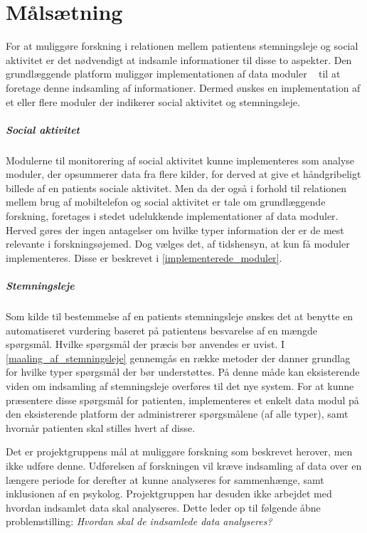 \chapter{Målsætning}\label{problem}
For at muliggøre forskning i relationen mellem patientens stemningsleje og social aktivitet er det nødvendigt at indsamle informationer til disse to aspekter.
Den grundlæggende platform muliggør implementationen af data moduler ~ til at foretage denne indsamling af informationer.
Dermed ønskes en implementation af et eller flere moduler der indikerer social aktivitet og stemningsleje.

\paragraph{Social aktivitet}
Modulerne til monitorering af social aktivitet kunne implementeres som analyse moduler, der opsummerer data fra flere kilder, for derved at give et håndgribeligt billede af en patients sociale aktivitet.
Men da der også i forhold til relationen mellem brug af mobiltelefon og social aktivitet er tale om grundlæggende forskning, foretages i stedet udelukkende implementationer af data moduler.
Herved gøres der ingen antagelser om hvilke typer information der er de mest relevante i forskningsøjemed.
Dog vælges det, af tidshensyn, at kun få moduler implementeres.
Disse er beskrevet i \cref{implementerede_moduler}.

\paragraph{Stemningsleje}
Som kilde til bestemmelse af en patients stemningsleje ønskes det at benytte en automatiseret vurdering baseret på patientens besvarelse af en mængde spørgsmål.
Hvilke spørgsmål der præcis bør anvendes er uvist.
I \cref{maaling_af_stemningsleje} gennemgås en række metoder der danner grundlag for hvilke typer spørgsmål der bør understøttes.
På denne måde kan eksisterende viden om indsamling af stemningsleje overføres til det nye system.
For at kunne præsentere disse spørgsmål for patienten, implementeres et enkelt data modul på den eksisterende platform\citefaelles{} der administrerer spørgsmålene (af alle typer), samt hvornår patienten skal stilles hvert af disse.

Det er projektgruppens mål at muliggøre forskning som beskrevet herover, men ikke udføre denne.
Udførelsen af forskningen vil kræve indsamling af data over en længere periode for derefter at kunne analyseres for sammenhænge, samt inklusionen af en psykolog.
Projektgruppen har desuden ikke arbejdet med hvordan indsamlet data skal analyseres.
Dette leder op til følgende åbne problemstilling: \textit{Hvordan skal de indsamlede data analyseres?}

